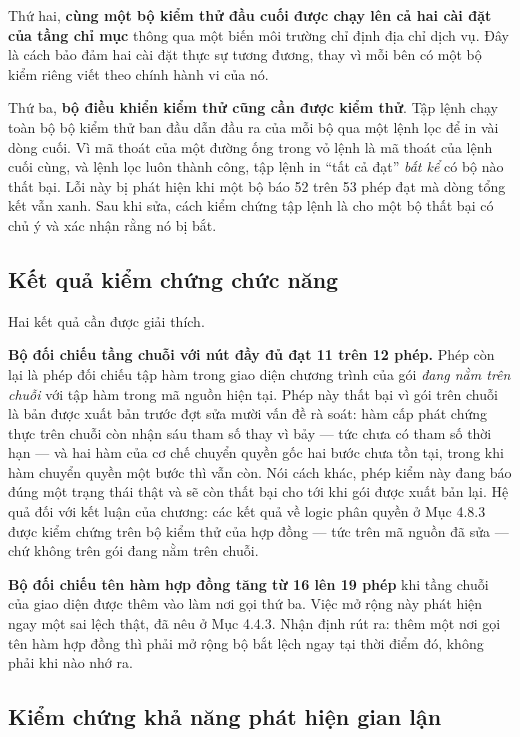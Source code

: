 Thứ hai, \textbf{cùng một bộ kiểm thử đầu cuối được chạy lên cả hai cài đặt của tầng chỉ mục} thông qua một biến môi trường chỉ định địa chỉ dịch vụ. Đây là cách bảo đảm hai cài đặt thực sự tương đương, thay vì mỗi bên có một bộ kiểm riêng viết theo chính hành vi của nó.

Thứ ba, \textbf{bộ điều khiển kiểm thử cũng cần được kiểm thử}. Tập lệnh chạy toàn bộ bộ kiểm thử ban đầu dẫn đầu ra của mỗi bộ qua một lệnh lọc để in vài dòng cuối. Vì mã thoát của một đường ống trong vỏ lệnh là mã thoát của lệnh cuối cùng, và lệnh lọc luôn thành công, tập lệnh in {``}tất cả đạt{''} \emph{bất kể} có bộ nào thất bại. Lỗi này bị phát hiện khi một bộ báo 52 trên 53 phép đạt mà dòng tổng kết vẫn xanh. Sau khi sửa, cách kiểm chứng tập lệnh là cho một bộ thất bại có chủ ý và xác nhận rằng nó bị bắt.

\subsection{Kết quả kiểm chứng chức năng}



Hai kết quả cần được giải thích.

\textbf{Bộ đối chiếu tầng chuỗi với nút đầy đủ đạt 11 trên 12 phép.} Phép còn lại là phép đối chiếu tập hàm trong giao diện chương trình của gói \emph{đang nằm trên chuỗi} với tập hàm trong mã nguồn hiện tại. Phép này thất bại vì gói trên chuỗi là bản được xuất bản trước đợt sửa mười vấn đề rà soát: hàm cấp phát chứng thực trên chuỗi còn nhận sáu tham số thay vì bảy --- tức chưa có tham số thời hạn --- và hai hàm của cơ chế chuyển quyền gốc hai bước chưa tồn tại, trong khi hàm chuyển quyền một bước thì vẫn còn. Nói cách khác, phép kiểm này đang báo đúng một trạng thái thật và sẽ còn thất bại cho tới khi gói được xuất bản lại. Hệ quả đối với kết luận của chương: các kết quả về logic phân quyền ở Mục 4.8.3 được kiểm chứng trên bộ kiểm thử của hợp đồng --- tức trên mã nguồn đã sửa --- chứ không trên gói đang nằm trên chuỗi.

\textbf{Bộ đối chiếu tên hàm hợp đồng tăng từ 16 lên 19 phép} khi tầng chuỗi của giao diện được thêm vào làm nơi gọi thứ ba. Việc mở rộng này phát hiện ngay một sai lệch thật, đã nêu ở Mục 4.4.3. Nhận định rút ra: thêm một nơi gọi tên hàm hợp đồng thì phải mở rộng bộ bắt lệch ngay tại thời điểm đó, không phải khi nào nhớ ra.

\subsection{Kiểm chứng khả năng phát hiện gian lận}

